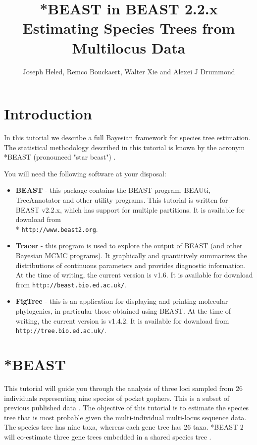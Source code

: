 \documentclass{article}
\newcommand{\BEASTVersion}{2.2.x}
\newcommand{\TracerVersion}{1.6}
\newcommand{\FigTreeVersion}{1.4.2}
\begin{document}
\title{*BEAST in BEAST {\BEASTVersion}\\
Estimating Species Trees from Multilocus Data}

\author{Joseph Heled, Remco Bouckaert, Walter Xie and Alexei J Drummond }

\maketitle

\section{Introduction}

In this tutorial we describe a full Bayesian framework for species tree estimation. The statistical methodology described in this tutorial is known by the acronym *BEAST (pronounced "star beast") \cite{Heled:2010fk}.

You will need the following software at your disposal:

\begin{itemize}

\item {\bf BEAST} - this package contains the BEAST program, BEAUti, TreeAnnotator and other utility programs. This tutorial is written for BEAST v{\BEASTVersion}, which has support for multiple partitions. It is available for download from \\* \texttt{http://www.beast2.org}.
\item {\bf Tracer} - this program is used to explore the output of BEAST (and other Bayesian MCMC programs). It graphically and
quantitively summarizes the distributions of continuous parameters and provides diagnostic information. At the time of
writing, the current version is v{\TracerVersion}. It is available for download from \texttt{http://beast.bio.ed.ac.uk/}.
\item {\bf FigTree} - this is an application for displaying and printing molecular phylogenies, in particular those obtained using
BEAST. At the time of writing, the current version is v{\FigTreeVersion}. It is available for download from \texttt{http://tree.bio.ed.ac.uk/}.
\end{itemize}

\section{*BEAST}

This tutorial will guide you through the analysis of three loci sampled from 26 individuals representing nine species of pocket gophers. This is a subset of previous published data \cite{belfiore2008multilocus}. The objective of this tutorial is to estimate the species tree that is most probable given the multi-individual multi-locus sequence data. The species tree has nine taxa, whereas each gene tree has 26 taxa. *BEAST 2 will co-estimate three gene trees embedded in a shared species tree \cite[for details]{Heled:2010fk}.
\end{document}
